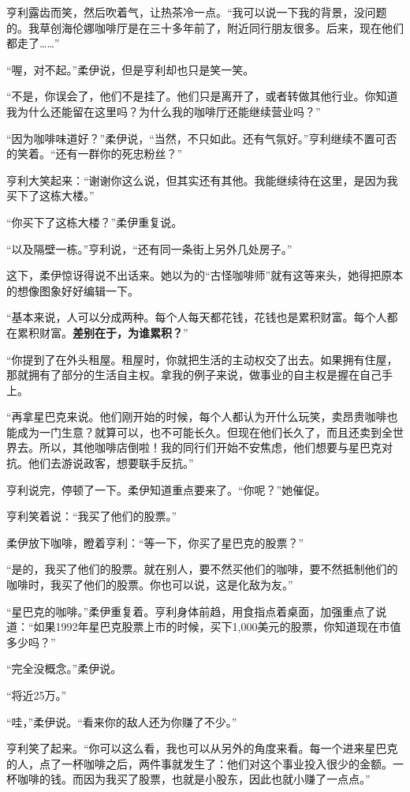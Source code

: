 亨利露齿而笑，然后吹着气，让热茶冷一点。“我可以说一下我的背景，没问题的。我草创海伦娜咖啡厅是在三十多年前了，附近同行朋友很多。后来，现在他们都走了……”

“喔，对不起。”柔伊说，但是亨利却也只是笑一笑。

“不是，你误会了，他们不是挂了。他们只是离开了，或者转做其他行业。你知道我为什么还能留在这里吗？为什么我的咖啡厅还能继续营业吗？”

“因为咖啡味道好？”柔伊说，“当然，不只如此。还有气氛好。”亨利继续不置可否的笑着。“还有一群你的死忠粉丝？”

亨利大笑起来：“谢谢你这么说，但其实还有其他。我能继续待在这里，是因为我买下了这栋大楼。”

“你买下了这栋大楼？”柔伊重复说。

“以及隔壁一栋。”亨利说，“还有同一条街上另外几处房子。”

这下，柔伊惊讶得说不出话来。她以为的“古怪咖啡师”就有这等来头，她得把原本的想像图象好好编辑一下。

“基本来说，人可以分成两种。每个人每天都花钱，花钱也是累积财富。每个人都在累积财富。\textbf{差别在于，为谁累积？}”

“你提到了在外头租屋。租屋时，你就把生活的主动权交了出去。如果拥有住屋，那就拥有了部分的生活自主权。拿我的例子来说，做事业的自主权是握在自己手上。

“再拿星巴克来说。他们刚开始的时候，每个人都认为开什么玩笑，卖昂贵咖啡也能成为一门生意？就算可以，也不可能长久。但现在他们长久了，而且还卖到全世界去。所以，其他咖啡店倒啦！我的同行们开始不安焦虑，他们想要与星巴克对抗。他们去游说政客，想要联手反抗。”

亨利说完，停顿了一下。柔伊知道重点要来了。“你呢？”她催促。

亨利笑着说：“我买了他们的股票。”

柔伊放下咖啡，瞪着亨利：“等一下，你买了星巴克的股票？”

“是的，我买了他们的股票。就在别人，要不然买他们的咖啡，要不然抵制他们的咖啡时，我买了他们的股票。你也可以说，这是化敌为友。”

“星巴克的咖啡。”柔伊重复着。亨利身体前趋，用食指点着桌面，加强重点了说道：“如果1992年星巴克股票上市的时候，买下1,000美元的股票，你知道现在市值多少吗？”

“完全没概念。”柔伊说。

“将近25万。”

“哇，”柔伊说。“看来你的敌人还为你赚了不少。”

亨利笑了起来。“你可以这么看，我也可以从另外的角度来看。每一个进来星巴克的人，点了一杯咖啡之后，两件事就发生了：他们对这个事业投入很少的金额。一杯咖啡的钱。而因为我买了股票，也就是小股东，因此也就小赚了一点点。”

